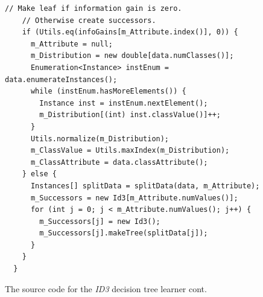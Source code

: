 \begin{figure}[!thp]
\begin{mdframed}[innermargin=-1cm]
\begin{Verbatim}[fontsize=\scriptsize]
    // Make leaf if information gain is zero.
    // Otherwise create successors.
    if (Utils.eq(infoGains[m_Attribute.index()], 0)) {
      m_Attribute = null;
      m_Distribution = new double[data.numClasses()];
      Enumeration<Instance> instEnum = data.enumerateInstances();
      while (instEnum.hasMoreElements()) {
        Instance inst = instEnum.nextElement();
        m_Distribution[(int) inst.classValue()]++;
      }
      Utils.normalize(m_Distribution);
      m_ClassValue = Utils.maxIndex(m_Distribution);
      m_ClassAttribute = data.classAttribute();
    } else {
      Instances[] splitData = splitData(data, m_Attribute);
      m_Successors = new Id3[m_Attribute.numValues()];
      for (int j = 0; j < m_Attribute.numValues(); j++) {
        m_Successors[j] = new Id3();
        m_Successors[j].makeTree(splitData[j]);
      }
    }
  }  
\end{Verbatim}
\end{mdframed}
\caption{\label{fig:scheme_id3}The source code for the \textit{ID3} decision tree learner cont.}
\end{figure}

